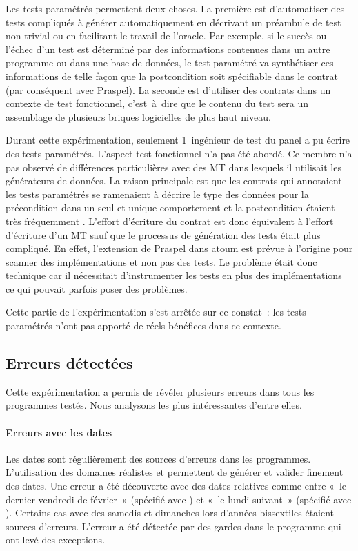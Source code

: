 Les tests paramétrés permettent deux choses. La première est d'automatiser des
tests compliqués à générer automatiquement en décrivant un préambule de test
non-trivial ou en facilitant le travail de l'oracle. Par exemple, si le succès
ou l'échec d'un test est déterminé par des informations contenues dans un autre
programme ou dans une base de données, le test paramétré va synthétiser ces
informations de telle façon que la postcondition soit spécifiable dans le
contrat (par conséquent avec Praspel). La seconde est d'utiliser des contrats
dans un contexte de test fonctionnel, c'est~à~dire que le contenu du test sera
un assemblage de plusieurs briques logicielles de plus haut niveau.

Durant cette expérimentation, seulement 1~ingénieur de test du panel a pu écrire
des tests paramétrés. L'aspect test fonctionnel n'a pas été abordé. Ce membre
n'a pas observé de différences particulières avec des MT dans lesquels il
utilisait les générateurs de données. La raison principale est que les contrats
qui annotaient les tests paramétrés se ramenaient à décrire le type des données
pour la précondition dans un seul et unique comportement et la postcondition
étaient très fréquemment . L'effort d'écriture du contrat
est donc équivalent à l'effort d'écriture d'un MT sauf que le processus de
génération des tests était plus compliqué. En effet, l'extension de Praspel dans
atoum est prévue à l'origine pour scanner des implémentations et non pas des
tests. Le problème était donc technique car il nécessitait d'instrumenter les
tests en plus des implémentations ce qui pouvait parfois poser des problèmes.

Cette partie de l'expérimentation s'est arrêtée sur ce constat~: les tests
paramétrés n'ont pas apporté de réels bénéfices dans ce contexte.

\subsection{Erreurs détectées}
\label{subsection:experimentation:errors}

Cette expérimentation a permis de révéler plusieurs erreurs dans tous les
programmes testés. Nous analysons les plus intéressantes d'entre elles.

\paragraph{Erreurs avec les dates} Les dates sont régulièrement des sources
d'erreurs dans les programmes. L'utilisation des domaines réalistes 
et  permettent de générer et valider finement des dates. Une
erreur a été découverte avec des dates relatives comme entre «~le dernier
vendredi de février~» (spécifié avec ) et «~le lundi suivant~» (spécifié avec ). Certains cas avec des samedis et dimanches lors d'années
bissextiles étaient sources d'erreurs. L'erreur a été détectée par des gardes
dans le programme qui ont levé des exceptions.

